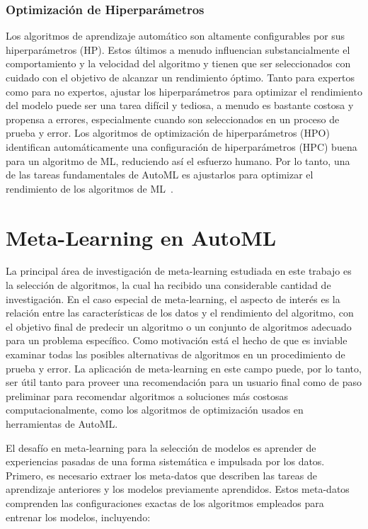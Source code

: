 \subsubsection{Optimización de Hiperparámetros}

Los algoritmos de aprendizaje automático son altamente configurables por sus
hiperparámetros (HP). Estos últimos a menudo influencian substancialmente el
comportamiento y la velocidad del algoritmo y tienen que ser seleccionados con
cuidado con el objetivo de alcanzar un rendimiento óptimo. Tanto para expertos
como para no expertos, ajustar los hiperparámetros para optimizar el
rendimiento del modelo puede ser una tarea difícil y tediosa, a menudo es
bastante costosa y propensa a errores, especialmente cuando son seleccionados
en un proceso de prueba y error. Los algoritmos de optimización de
hiperparámetros (HPO) identifican automáticamente una configuración de
hiperparámetros (HPC) buena para un algoritmo de ML, reduciendo así el esfuerzo
humano. Por lo tanto, una de las tareas fundamentales de AutoML es ajustarlos
para optimizar el rendimiento de los algoritmos de ML~\cite{li2021automl}.

\section{Meta-Learning en AutoML}\label{section:meta-with-AutoML}

La principal área de investigación de meta-learning estudiada en este trabajo
es la selección de algoritmos, la cual ha recibido una considerable cantidad
de investigación. En el caso especial de meta-learning, el aspecto de interés
es la relación entre las características de los datos y el rendimiento del
algoritmo, con el objetivo final de predecir un algoritmo o un conjunto de
algoritmos adecuado para un problema específico. Como motivación está el hecho
de que es inviable examinar todas las posibles alternativas de algoritmos en un
procedimiento de prueba y error. La aplicación de meta-learning en este campo
puede, por lo tanto, ser útil tanto para proveer una recomendación para un
usuario final como de paso preliminar para recomendar algoritmos a soluciones
más costosas computacionalmente, como los algoritmos de optimización usados en
herramientas de AutoML. 

El desafío en meta-learning para la selección de modelos es aprender de
experiencias pasadas de una forma sistemática e impulsada por los datos.
Primero, es necesario extraer los meta-datos que describen las tareas de
aprendizaje anteriores y los modelos previamente aprendidos. Estos meta-datos
comprenden las configuraciones exactas de los algoritmos empleados para
entrenar los modelos, incluyendo:

